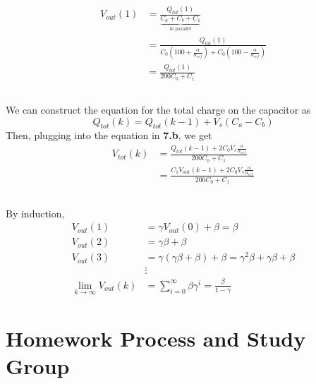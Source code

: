 \documentclass[]{article}
\begin{document}
\begin{align}
	V_{out}(1) &= \frac{Q_{tot}(1)}{\underbrace{C_a + C_b + C_1}_{\text{in parallel}}} \\
	&= \frac{Q_{tot}(1)}{C_0 \left(100 + \frac{\alpha}{\alpha_{ref}}\right) + C_0 \left(100 - \frac{\alpha}{\alpha_{ref}}\right)} \\
	&= \frac{Q_{tot}(1)}{200C_0 + C_1}
\end{align}

\subsection{}

We can construct the equation for the total charge on the capacitor as
\begin{equation}
	Q_{tot}(k) = Q_{tot}(k - 1) + V_s(C_a - C_b)
\end{equation}
Then, plugging into the equation in \textbf{7.b}, we get
\begin{align}
	V_{tot}(k) &= \frac{Q_{tot}(k - 1) + 2 C_0 V_s \frac{\alpha}{\alpha_{ref}}}{200C_0 + C_1} \\
	&= \frac{C_1 V_{out}(k - 1) + 2 C_0 V_s \frac{\alpha}{\alpha_{ref}}}{200C_0 + C_1}
\end{align}

\subsection{}

By induction,
\begin{align}
	V_{out}(1) &= \gamma V_{out}(0) + \beta = \beta \\
	V_{out}(2) &= \gamma \beta + \beta \\
	V_{out}(3) &= \gamma (\gamma \beta + \beta) + \beta = \gamma^2 \beta + \gamma \beta + \beta \\
	&\vdots \\
	\lim_{k \to \infty} V_{out}(k) &= \sum_{i = 0}^{\infty} \beta \gamma^i = \frac{\beta}{1 - \gamma}
\end{align}

\section{Homework Process and Study Group}

\subsection{}
\end{document}
